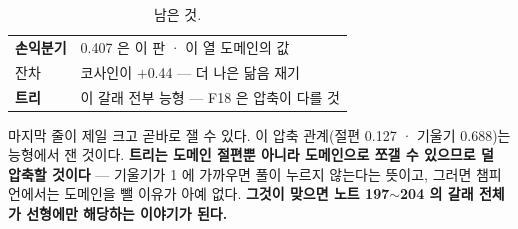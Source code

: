 \documentclass[10pt]{article}
\begin{document}
\begin{table}[t]
\centering\tsize
\caption{남은 것.}
\begin{tabular}{ll}
\toprule
\textbf{손익분기} & 0.407 은 이 판 · 이 열 도메인의 값 \\
잔차 & 코사인이 $+$0.44 --- 더 나은 닮음 재기 \\
\textbf{트리} & 이 갈래 전부 능형 --- F18 은 압축이 다를 것 \\
\bottomrule
\end{tabular}
\end{table}

마지막 줄이 제일 크고 곧바로 잴 수 있다. 이 압축 관계(절편 0.127 · 기울기
0.688)는 능형에서 잰 것이다. \textbf{트리는 도메인 절편뿐 아니라 도메인으로
쪼갤 수 있으므로 덜 압축할 것이다} --- 기울기가 1 에 가까우면 풀이 누르지
않는다는 뜻이고, 그러면 챔피언에서는 도메인을 뺄 이유가 아예 없다.
\textbf{그것이 맞으면 노트 197$\sim$204 의 갈래 전체가 선형에만 해당하는
이야기가 된다.}
\end{document}

